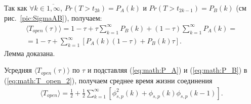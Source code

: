 Так как $\forall k \in \overline{1,\infty}$,  $Pr(T>t_{2k}) = P_A(k)$ и $Pr(T>t_{2k-1}) = P_B(k)$ (см рис.~\ref{pic:SigmaAB}),  получаем:
\begin{equation}
\begin{array}{c}
\label{eq:math:T_open_2-2}
\langle T_{open} (\tau)\rangle = 1-\tau + \tau \sum \limits_{k=1}^{\infty}  P_B(k) + (1-\tau)\sum \limits_{k=1}^{\infty} P_A(k) = \\
= 1-\tau + \sum \limits^{\infty}_{k=1} \left[ P_A(k) (1-\tau) +  P_B(k) \tau \right].
\end{array}
\end{equation}Лемма доказана.

Усредняя $\langle T_{open} (\tau) \rangle$ по $\tau$ и подставляя (\ref{eq:math:P_A}) и (\ref{eq:math:P_B}) в (\ref{eq:math:T_open_2}),  получаем среднее время жизни соединения
\begin{equation}
\label{eq:math:T_open_final}
\begin{array}{c}
\langle T_{open}\rangle = \frac{1}{2} + \frac{1}{2} \sum \limits^{\infty}_{k=1} \left[ \phi_{s,p}^2(k) +  \phi_{s,p}(k)\phi_{s,p}(k-1) \right].
\end{array}
\end{equation}

